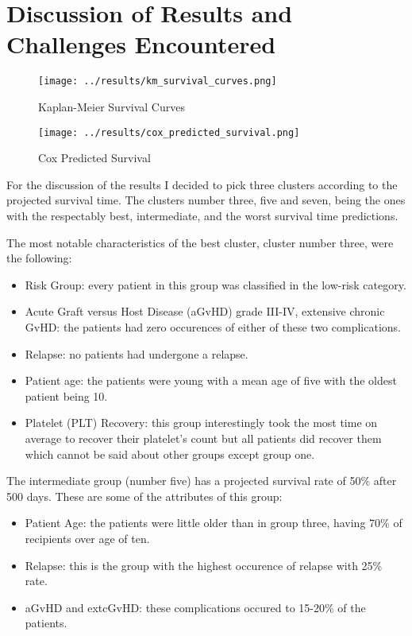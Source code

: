 \documentclass[a4paper,12pt]{article}
\begin{document}
\section{Discussion of Results and Challenges Encountered}

\begin{figure}[h]
  \centering
  \begin{minipage}{0.48\textwidth}
    \centering
    \texttt{[image: ../results/km\_survival\_curves.png]}
    \caption{Kaplan-Meier Survival Curves}
  \end{minipage}
  \begin{minipage}{0.48\textwidth}
    \centering
    \texttt{[image: ../results/cox\_predicted\_survival.png]}
    \caption{Cox Predicted Survival}
  \end{minipage}\hfill
\end{figure}

For the discussion of the results I decided to pick three clusters according to the projected survival time. The clusters number three, five and seven, being the ones with the respectably best, intermediate, and the worst survival time predictions.

The most notable characteristics of the best cluster, cluster number three, were the following:

\begin{itemize}
  \item Risk Group: every patient in this group was classified in the low-risk category.
  \item Acute Graft versus Host Disease (aGvHD) grade III-IV, extensive chronic GvHD: the patients had zero occurences of either of these two complications.
  \item Relapse: no patients had undergone a relapse.
  \item Patient age: the patients were young with a mean age of five with the oldest patient being 10.
  \item Platelet (PLT) Recovery: this group interestingly took the most time on average to recover their platelet's count but all patients did recover them which cannot be said about other groups except group one.
\end{itemize}

The intermediate group (number five) has a projected survival rate of 50\% after 500 days. These are some of the attributes of this group:

\begin{itemize}
  \item Patient Age: the patients were little older than in group three, having 70\% of recipients over age of ten.
  \item Relapse: this is the group with the highest occurence of relapse with 25\% rate.
  \item aGvHD and extcGvHD: these complications occured to 15-20\% of the patients.
\end{itemize}
\end{document}

